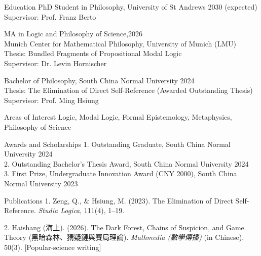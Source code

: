 \documentclass{resume}
\begin{document}
\begin{rSection}{Education}
PhD Student in Philosophy, University of St Andrews \hfill 2030 (expected)
\\ Supervisor: Prof. Franz Berto

MA in Logic and Philosophy of Science,\hfill 2026
\\ Munich Center for Mathematical Philosophy, University of Munich (LMU)
\\ Thesis: Bundled Fragments of Propositional Modal Logic
\\ Supervisor: Dr. Levin Hornischer

Bachelor of Philosophy, South China Normal University \hfill 2024
\\ Thesis: The Elimination of Direct Self-Reference (Awarded Outstanding Thesis)
\\ Supervisor: Prof. Ming Hsiung
\end{rSection}

\begin{rSection}{Areas of Interest}
Logic, Modal Logic, Formal Epistemology, Metaphysics, Philosophy of Science
\end{rSection}

\begin{rSection}{Awards and Scholarships}
1. Outstanding Graduate, South China Normal University \hfill 2024
\\ 2. Outstanding Bachelor's Thesis Award, South China Normal University \hfill 2024
\\ 3. First Prize, Undergraduate Innovation Award (CNY 2000), South China Normal University \hfill 2023
\end{rSection}

\begin{rSection}{Publications}
1. Zeng, Q., \& Hsiung, M. (2023). The Elimination of Direct Self-Reference. \textit{Studia Logica}, 111(4), 1--19.

2. Haishang (海上). (2026). The Dark Forest, Chains of Suspicion, and Game Theory (黑暗森林、猜疑鏈與賽局理論). \textit{Mathmedia (數學傳播)} (in Chinese), 50(3). [Popular-science writing]
\end{rSection}
\end{document}
